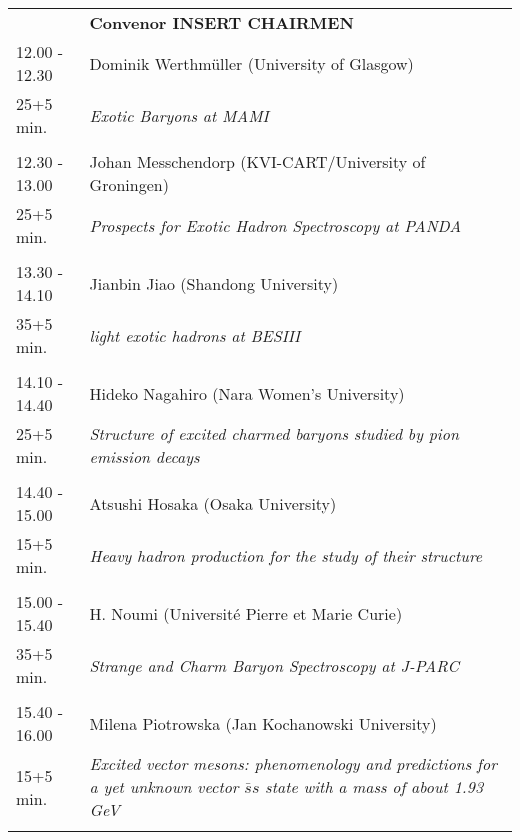 \begin{longtable}{p{3cm}p{13cm}}
&\hfill {\bf Convenor INSERT CHAIRMEN }\\ 
12.00 - 12.30 & Dominik Werthmüller (University of Glasgow)\\ 
25+5 min. & {\it Exotic Baryons at MAMI}\\ 
 & \\ 
12.30 - 13.00 & Johan Messchendorp (KVI-CART/University of Groningen)\\ 
25+5 min. & {\it Prospects for Exotic Hadron Spectroscopy at PANDA}\\ 
 & \\ 
13.30 - 14.10 & Jianbin Jiao (Shandong University)\\ 
35+5 min. & {\it light exotic hadrons at BESIII}\\ 
 & \\ 
14.10 - 14.40 & Hideko Nagahiro (Nara Women's University)\\ 
25+5 min. & {\it Structure of excited charmed baryons studied by pion emission decays}\\ 
 & \\ 
14.40 - 15.00 & Atsushi Hosaka (Osaka University)\\ 
15+5 min. & {\it Heavy hadron production for the study of their structure}\\ 
 & \\ 
15.00 - 15.40 & H. Noumi (Université Pierre et Marie Curie)\\ 
35+5 min. & {\it Strange and Charm Baryon Spectroscopy at J-PARC}\\ 
 & \\ 
15.40 - 16.00 & Milena Piotrowska (Jan Kochanowski University)\\ 
15+5 min. & {\it Excited vector mesons: phenomenology and predictions for a yet unknown vector $\bar{s}s$ state with a mass of about 1.93 GeV}\\ 
 & \\ 
\end{longtable}


